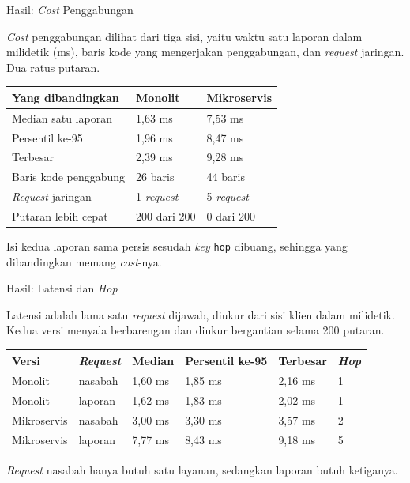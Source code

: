 \documentclass[aspectratio=169, table, 12pt]{beamer}
\begin{document}
\begin{frame}{{\Large Hasil: \textit{Cost} Penggabungan}}
  \vspace{10pt}
  \raggedright
  {\small \textit{Cost} penggabungan dilihat dari tiga sisi, yaitu waktu satu
  laporan dalam milidetik (ms), baris kode yang mengerjakan penggabungan, dan
  \textit{request} jaringan. Dua ratus putaran.}

  \vspace{4pt}
  \centering
  \small
  \begin{tabularx}{0.82\textwidth}{|X|l|l|}
    \hline
    \textbf{Yang dibandingkan} & \textbf{Monolit} & \textbf{Mikroservis} \\
    \hline
    Median satu laporan & 1,63 ms & 7,53 ms \\
    \hline
    Persentil ke-95 & 1,96 ms & 8,47 ms \\
    \hline
    Terbesar & 2,39 ms & 9,28 ms \\
    \hline
    Baris kode penggabung & 26 baris & 44 baris \\
    \hline
    \textit{Request} jaringan & 1 \textit{request} & 5 \textit{request} \\
    \hline
    Putaran lebih cepat & 200 dari 200 & 0 dari 200 \\
    \hline
  \end{tabularx}

  \vspace{6pt}
  \raggedright
  {\small Isi kedua laporan sama persis sesudah \textit{key} \texttt{hop}
  dibuang, sehingga yang dibandingkan memang \textit{cost}-nya.}
\end{frame}

\begin{frame}{{\Large Hasil: Latensi dan \textit{Hop}}}
  \vspace{10pt}
  \raggedright
  {\small Latensi adalah lama satu \textit{request} dijawab, diukur dari sisi
  klien dalam milidetik. Kedua versi menyala berbarengan dan diukur bergantian
  selama 200 putaran.}

  \vspace{4pt}
  \centering
  \small
  \begin{tabularx}{0.96\textwidth}{|l|X|l|l|l|l|}
    \hline
    \textbf{Versi} & \textbf{\textit{Request}} & \textbf{Median} & \textbf{Persentil ke-95} & \textbf{Terbesar} & \textbf{\textit{Hop}} \\
    \hline
    Monolit & nasabah & 1,60 ms & 1,85 ms & 2,16 ms & 1 \\
    \hline
    Monolit & laporan & 1,62 ms & 1,83 ms & 2,02 ms & 1 \\
    \hline
    Mikroservis & nasabah & 3,00 ms & 3,30 ms & 3,57 ms & 2 \\
    \hline
    Mikroservis & laporan & 7,77 ms & 8,43 ms & 9,18 ms & 5 \\
    \hline
  \end{tabularx}

  \vspace{6pt}
  \raggedright
  {\small \textit{Request} nasabah hanya butuh satu layanan, sedangkan laporan
  butuh ketiganya.}
\end{frame}
\end{document}
